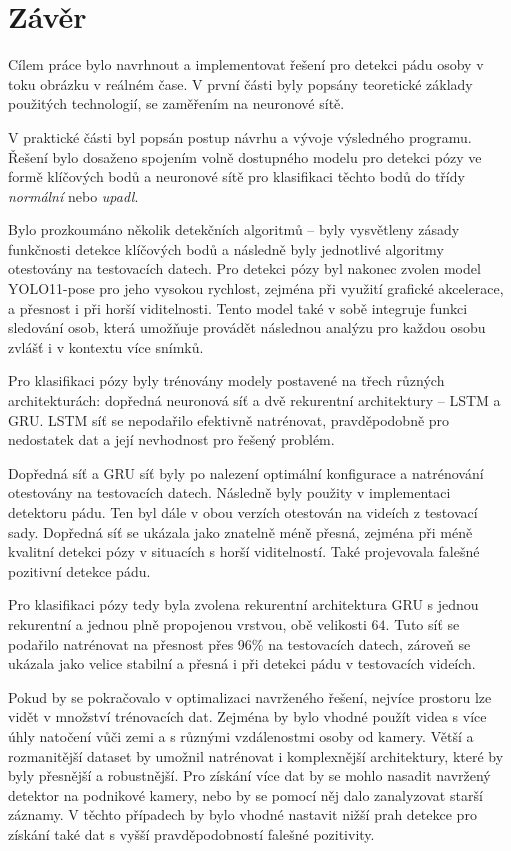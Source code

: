 \chapter{Závěr}
\label{chap:Conclusion}

Cílem práce bylo navrhnout a implementovat řešení pro detekci pádu osoby v toku
obrázku v reálném čase. V první části byly popsány teoretické základy použitých
technologií, se zaměřením na neuronové sítě.

V praktické části byl popsán postup návrhu a vývoje výsledného programu. Řešení
bylo dosaženo spojením volně dostupného modelu pro detekci pózy ve formě
klíčových bodů a neuronové sítě pro klasifikaci těchto bodů do třídy
\textit{normální} nebo \textit{upadl}.

Bylo prozkoumáno několik detekčních algoritmů – byly vysvětleny zásady
funkčnosti detekce klíčových bodů a následně byly jednotlivé algoritmy
otestovány na testovacích datech. Pro detekci pózy byl nakonec zvolen model
YOLO11-pose pro jeho vysokou rychlost, zejména při využití grafické akcelerace,
a přesnost i při horší viditelnosti. Tento model také v sobě integruje funkci
sledování osob, která umožňuje provádět následnou analýzu pro každou osobu
zvlášť i v kontextu více snímků.

Pro klasifikaci pózy byly trénovány modely postavené na třech různých
architekturách: dopředná neuronová síť a dvě rekurentní architektury – LSTM a
GRU. LSTM síť se nepodařilo efektivně natrénovat, pravděpodobně pro nedostatek
dat a její nevhodnost pro řešený problém.

Dopředná síť a GRU síť byly po nalezení optimální konfigurace a natrénování
otestovány na testovacích datech. Následně byly použity v implementaci
detektoru pádu. Ten byl dále v obou verzích otestován na videích z testovací
sady. Dopředná síť se ukázala jako znatelně méně přesná, zejména při méně
kvalitní detekci pózy v situacích s horší viditelností. Také projevovala
falešné pozitivní detekce pádu.

Pro klasifikaci pózy tedy byla zvolena rekurentní architektura GRU s jednou
rekurentní a jednou plně propojenou vrstvou, obě velikosti $64$. Tuto síť se
podařilo natrénovat na přesnost přes 96\% na testovacích datech, zároveň se
ukázala jako velice stabilní a přesná i při detekci pádu v testovacích videích.

Pokud by se pokračovalo v optimalizaci navrženého řešení, nejvíce prostoru lze
vidět v množství trénovacích dat. Zejména by bylo vhodné použít videa s více
úhly natočení vůči zemi a s různými vzdálenostmi osoby od kamery. Větší a
rozmanitější dataset by umožnil natrénovat i komplexnější architektury, které
by byly přesnější a robustnější. Pro získání více dat by se mohlo nasadit
navržený detektor na podnikové kamery, nebo by se pomocí něj dalo zanalyzovat
starší záznamy. V těchto případech by bylo vhodné nastavit nižší prah detekce
pro získání také dat s vyšší pravděpodobností falešné pozitivity.

